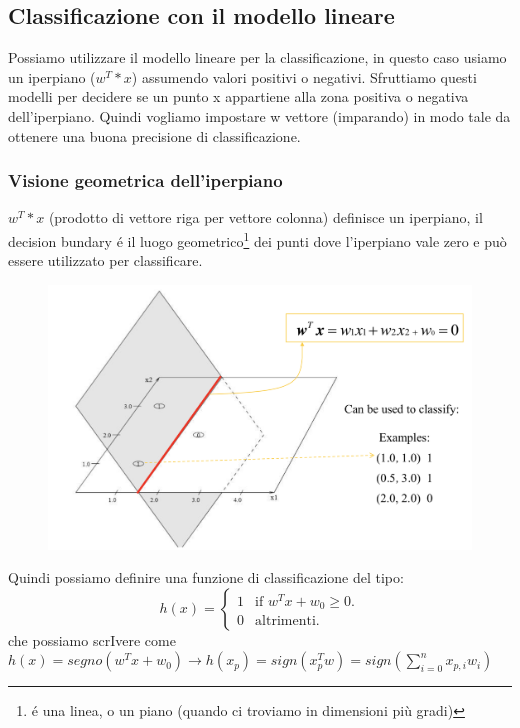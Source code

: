 \documentclass{article}
\begin{document}
\subsection{Classificazione con il modello lineare}
Possiamo utilizzare il modello lineare per la classificazione, in questo caso usiamo un iperpiano ($w^T*x$) assumendo valori positivi o negativi. Sfruttiamo questi modelli per decidere se un punto x appartiene alla zona positiva o negativa dell'iperpiano. Quindi vogliamo impostare w vettore (imparando) in modo tale da ottenere una buona precisione di classificazione.

\subsubsection{Visione geometrica dell'iperpiano}
$w^T*x$ (prodotto di vettore riga per vettore colonna) definisce un iperpiano, il decision bundary é il luogo geometrico\footnote{é una linea, o un piano (quando ci troviamo in dimensioni più gradi)} dei punti dove l'iperpiano vale zero e può essere utilizzato per classificare.
\begin{figure}[H]
\centering
\includegraphics[scale=0.5]{Images/deecisionbundary.png}
\end{figure}
Quindi possiamo definire una funzione di classificazione del tipo:
\begin{equation}
  h(x)=\begin{cases}
    1 & \text{if $w^Tx+w_0\geq 0$}.\\
    0 & \text{altrimenti}.
  \end{cases}
\end{equation}
che possiamo scrIvere come $h(x)=segno(w^Tx+w_0) \rightarrow h(x_p)=sign(x_p^Tw)=sign(\sum_{i=0}^n x_{p,i}w_i)$
\end{document}
